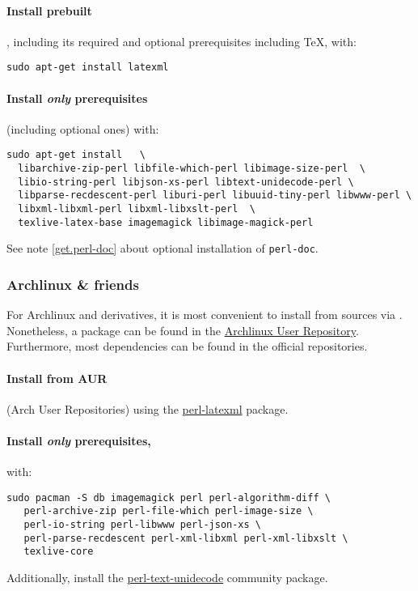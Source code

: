 \documentclass{article}
\begin{document}
\paragraph*{Install prebuilt} \LaTeXML, including its required and optional prerequisites
including \TeX, with:
\begin{lstlisting}[style=shell]
sudo apt-get install latexml
\end{lstlisting}

\paragraph*{Install \emph{only} prerequisites}\label{get.linux.debian.prereq}
(including optional ones) with:
\begin{lstlisting}[style=shell]
sudo apt-get install   \
  libarchive-zip-perl libfile-which-perl libimage-size-perl  \
  libio-string-perl libjson-xs-perl libtext-unidecode-perl \
  libparse-recdescent-perl liburi-perl libuuid-tiny-perl libwww-perl \
  libxml-libxml-perl libxml-libxslt-perl  \
  texlive-latex-base imagemagick libimage-magick-perl
\end{lstlisting}
See note \ref{get.perl-doc} about optional installation of \texttt{perl-doc}.

\subsubsection{Archlinux \& friends}\label{get.linux.arch}
For Archlinux and derivatives, it is most convenient to install from sources via . 
Nonetheless, a package can be found in the \href{https://aur.archlinux.org/}{Archlinux User Repository}.
Furthermore, most dependencies can be found in the official repositories.

\paragraph*{Install from AUR} (Arch User Repositories)
using the \href{https://aur.archlinux.org/packages/perl-latexml/}{perl-latexml} package. 

\paragraph*{Install \emph{only} prerequisites,} with:
\begin{lstlisting}[style=shell]
sudo pacman -S db imagemagick perl perl-algorithm-diff \
   perl-archive-zip perl-file-which perl-image-size \
   perl-io-string perl-libwww perl-json-xs \
   perl-parse-recdescent perl-xml-libxml perl-xml-libxslt \
   texlive-core
\end{lstlisting}
Additionally, install the \href{https://archlinux.org/packages/community/x86_64/perl-text-unidecode/}{perl-text-unidecode}
community package. 
\end{document}
